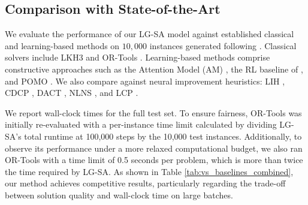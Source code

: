 \documentclass[letterpaper]{article} %
\begin{document}

\subsection{Comparison with State-of-the-Art}
We evaluate the performance of our LG-SA model against established classical and learning-based methods on $10{,}000$ instances generated following \citet{nazari_reinforcement_2018}.
Classical solvers include LKH3 \citep{helsgaun_extension_2017} and OR-Tools \citep{ortools_routing}. Learning-based methods comprise constructive approaches such as the Attention Model (AM) \citep{kool_attention_2019}, the RL baseline of \citet{nazari_reinforcement_2018}, and POMO \citep{kwon_pomo_2021}. We also compare against neural improvement heuristics: LIH \citep{wu_learning_2022}, CDCP \citep{garcia-torres_combining_2022}, DACT \citep{ma_learning_2021}, NLNS \citep{hottung_neural_2022}, and LCP \citep{kim_learning_2021}.

We report wall-clock times for the full test set. To ensure fairness, OR-Tools was initially re-evaluated with a per-instance time limit calculated by dividing LG-SA's total runtime at 100,000 steps by the 10,000 test instances. Additionally, to observe its performance under a more relaxed computational budget, we also ran OR-Tools with a time limit of 0.5 seconds per problem, which is more than twice the time required by LG-SA. As shown in Table \ref{tab:vs_baselines_combined}, our method achieves competitive results, particularly regarding the trade-off between solution quality and wall-clock time on large batches.
\end{document}
